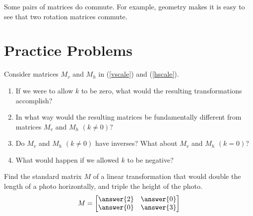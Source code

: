 \documentclass{ximera}
\begin{document}
\begin{example}\label{ex:rotationscommute}
Some pairs of matrices do commute.  For example, geometry makes it is easy to see that two rotation matrices commute.
\end{example}




 
\section*{Practice Problems}
\begin{problem}\label{prob:k0}
Consider matrices $M_v$ and $M_h$ in (\ref{vscale}) and (\ref{hscale}).  
\begin{enumerate}
\item
If we were to allow $k$ to be zero, what would the resulting transformations accomplish?  
\item In what way would the resulting matrices be fundamentally different from matrices $M_v$ and $M_h$ $(k\neq 0)$?  
\item Do $M_v$ and $M_h$ $(k\neq 0)$ have inverses?  What about $M_v$ and $M_h$ $(k= 0)$?  
\item What would happen if we allowed $k$ to be negative?
\end{enumerate}
\end{problem}

\begin{problem}\label{prob:matrixlintrans} Find the standard matrix $M$ of a linear transformation that would double the length of a photo horizontally, and triple the height of the photo.
$$M=\begin{bmatrix}\answer{2} & \answer{0}\\\answer{0} & \answer{3}\end{bmatrix}$$
\end{problem}
\end{document}
